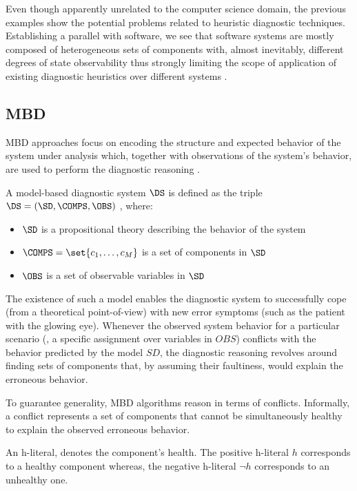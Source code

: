 Even though apparently unrelated to the computer science domain, the
previous examples show the potential problems related to heuristic
diagnostic techniques.
%
Establishing a parallel with software, we see that software systems
are mostly composed of heterogeneous sets of components with, almost
inevitably, different degrees of state observability thus strongly
limiting the scope of application of existing diagnostic heuristics
over different systems \cite{Salehie05}.

\subsection{\acl{MBD}}
\label{sec:intro:model-based-diagnosis}
\ac{MBD} approaches focus on encoding the structure and expected
behavior of the system under analysis which, together with
observations of the system's behavior, are used to perform the
diagnostic reasoning \cite{Kleer87,Reiter87}.
%
\begin{definition}
  A model-based diagnostic system $\DS$ is defined as the triple
  $\DS = (\SD, \COMPS,\OBS)$ , where:
  \begin{itemize}
  \item $\SD$ is a propositional theory describing the behavior of the system
  \item $\COMPS = \set{c_1 , \ldots, c_M }$ is a set of components in $\SD$
  \item $\OBS$ is a set of observable variables in $\SD$
  \end{itemize}
\end{definition}


The existence of such a model enables the diagnostic system to
successfully cope (from a theoretical point-of-view) with new error
symptoms (such as the patient with the glowing eye).
%
Whenever the observed system behavior for a particular scenario (\ie,
a specific assignment over variables in $OBS$) conflicts with the
behavior predicted by the model $SD$, the diagnostic reasoning
revolves around finding sets of components that, by assuming their
faultiness, would explain the erroneous behavior.

To guarantee generality, \ac{MBD} algorithms reason in terms of
conflicts.
%
Informally, a conflict represents a set of components that cannot be
simultaneously healthy to explain the observed erroneous behavior.

\begin{definition}[h-literal]
  An h-literal, denotes the component's health.
  The positive h-literal $h$ corresponds to a healthy component
  whereas, the negative h-literal $\neg h$ corresponds to an
  unhealthy one.
\end{definition}

